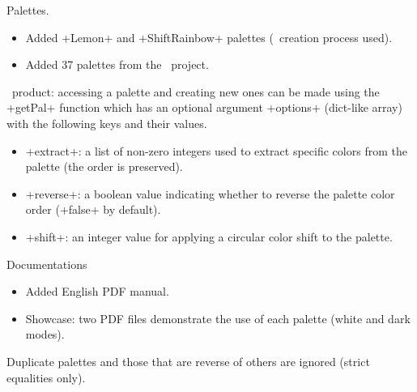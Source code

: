 \documentclass{tutodoc}
\begin{document}
\begin{tdocnew}
    \item Palettes.
    \begin{itemize}
        \item Added  +Lemon+ and +ShiftRainbow+ palettes (\LUADRAW\ creation process used).

        \item Added 37 palettes from the \scicolmaps\ project.
    \end{itemize}


    \item \LUADRAW\ product: accessing a palette and creating new ones can be made using the +getPal+ function which has an optional argument +options+ (dict-like array) with the following keys and their values.
    \begin{itemize}
        \item {}+extract+: a list of non-zero integers used to extract specific colors from the palette (the order is preserved).

        \item {}+reverse+: a boolean value indicating whether to reverse the palette color order (+false+ by default).

        \item {}+shift+: an integer value for applying a circular color shift to the palette.
    \end{itemize}


    \item Documentations
    \begin{itemize}
        \item Added English PDF manual.

        \item Showcase: two PDF files demonstrate the use of each palette (white and dark modes).
    \end{itemize}
\end{tdocnew}

\tdocsep

\begin{tdocbreak}[version = 1.1.0, date = 2025-10-14]
    \item Duplicate palettes and those that are reverse of others are ignored (strict equalities only).
\end{tdocbreak}


\end{document}
